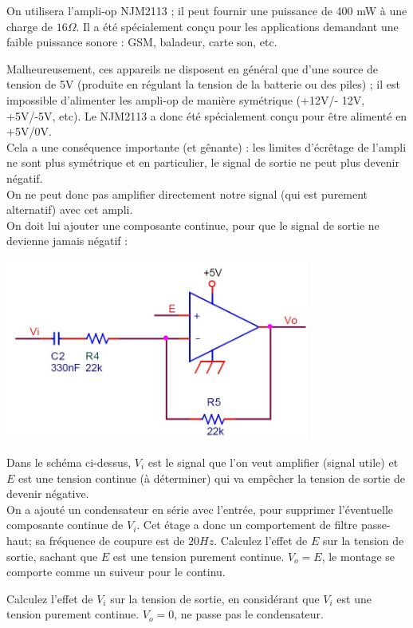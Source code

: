 \documentclass{../template/labo}
\begin{document}
On utilisera l'ampli-op NJM2113 ; il peut fournir une puissance de 400 mW à une charge de $16\Omega$. Il a été spécialement conçu pour les applications demandant une faible puissance sonore : GSM, baladeur, carte son, etc.

Malheureusement, ces appareils ne disposent en général que d'une source de tension de 5V (produite en régulant la tension de la batterie ou des piles) ; il est impossible d'alimenter les ampli-op de manière symétrique (+12V/- 12V, +5V/-5V, etc). Le NJM2113 a donc été spécialement conçu pour être alimenté en +5V/0V.\\
Cela a une conséquence importante (et gênante) : les limites d'écrêtage de l'ampli ne sont plus symétrique et en particulier, le signal de sortie ne peut plus devenir négatif.\\
On ne peut donc pas amplifier directement notre signal (qui est purement alternatif) avec cet ampli.\\
On doit lui ajouter une composante continue, pour que le signal de sortie ne devienne jamais négatif :
\begin{center}
\includegraphics[width=10cm]{figures/AOPetage3}
\end{center}

Dans le schéma ci-dessus, $V_i$ est le signal que l'on veut amplifier (signal utile) et $E$ est une tension continue (à déterminer) qui va empêcher la tension de sortie de devenir négative.\\
On a ajouté un condensateur en série avec l'entrée, pour supprimer l'éventuelle composante continue de $V_i$. Cet étage a donc un comportement de filtre passe-haut; sa fréquence de coupure est de $20Hz$.
\Question
{
Calculez l'effet de $E$ sur la tension de sortie, sachant que $E$ est une tension purement continue.
}
{$V_o = E$, le montage se comporte comme un suiveur pour le continu.}

\Question
{
Calculez l'effet de $V_i$ sur la tension de sortie, en considérant que $V_i$ est une tension purement continue.
}
{$V_o = 0$, ne passe pas le condensateur.}
\end{document}

